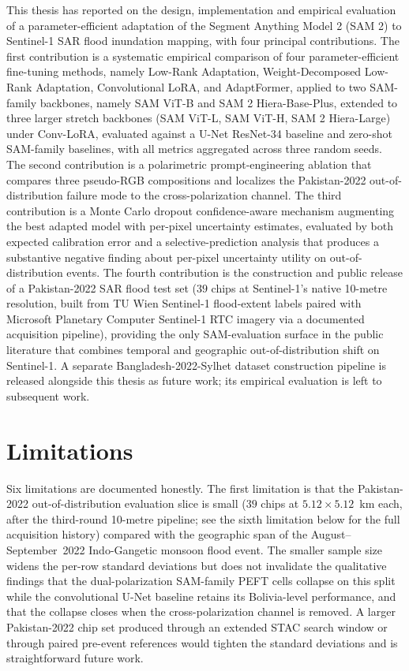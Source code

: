 \documentclass[11pt,a4paper,oneside]{report}
\begin{document}
This thesis has reported on the design, implementation and empirical evaluation of a parameter-efficient adaptation of the Segment Anything Model 2 (SAM 2) to Sentinel-1 SAR flood inundation mapping, with four principal contributions. The first contribution is a systematic empirical comparison of four parameter-efficient fine-tuning methods, namely Low-Rank Adaptation, Weight-Decomposed Low-Rank Adaptation, Convolutional LoRA, and AdaptFormer, applied to two SAM-family backbones, namely SAM ViT-B and SAM 2 Hiera-Base-Plus, extended to three larger stretch backbones (SAM ViT-L, SAM ViT-H, SAM 2 Hiera-Large) under Conv-LoRA, evaluated against a U-Net ResNet-34 baseline and zero-shot SAM-family baselines, with all metrics aggregated across three random seeds. The second contribution is a polarimetric prompt-engineering ablation that compares three pseudo-RGB compositions and localizes the Pakistan-2022 out-of-distribution failure mode to the cross-polarization channel. The third contribution is a Monte Carlo dropout confidence-aware mechanism augmenting the best adapted model with per-pixel uncertainty estimates, evaluated by both expected calibration error and a selective-prediction analysis that produces a substantive negative finding about per-pixel uncertainty utility on out-of-distribution events. The fourth contribution is the construction and public release of a Pakistan-2022 SAR flood test set ($39$ chips at Sentinel-1's native 10-metre resolution, built from TU Wien Sentinel-1 flood-extent labels paired with Microsoft Planetary Computer Sentinel-1 RTC imagery via a documented acquisition pipeline), providing the only SAM-evaluation surface in the public literature that combines temporal and geographic out-of-distribution shift on Sentinel-1. A separate Bangladesh-2022-Sylhet dataset construction pipeline is released alongside this thesis as future work; its empirical evaluation is left to subsequent work.

\section{Limitations}

Six limitations are documented honestly. The first limitation is that the Pakistan-2022 out-of-distribution evaluation slice is small ($39$ chips at $5.12 \times 5.12$~km each, after the third-round 10-metre pipeline; see the sixth limitation below for the full acquisition history) compared with the geographic span of the August--September~2022 Indo-Gangetic monsoon flood event. The smaller sample size widens the per-row standard deviations but does not invalidate the qualitative findings that the dual-polarization SAM-family PEFT cells collapse on this split while the convolutional U-Net baseline retains its Bolivia-level performance, and that the collapse closes when the cross-polarization channel is removed. A larger Pakistan-2022 chip set produced through an extended STAC search window or through paired pre-event references would tighten the standard deviations and is straightforward future work.
\end{document}
